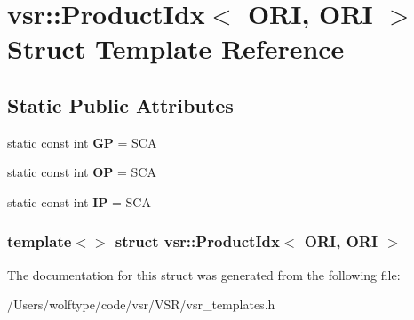 \hypertarget{structvsr_1_1_product_idx_3_01_o_r_i_00_01_o_r_i_01_4}{\section{vsr\-:\-:Product\-Idx$<$ O\-R\-I, O\-R\-I $>$ Struct Template Reference}
\label{structvsr_1_1_product_idx_3_01_o_r_i_00_01_o_r_i_01_4}
}
\subsection*{Static Public Attributes}
\begin{DoxyCompactItemize}
\item 
\hypertarget{structvsr_1_1_product_idx_3_01_o_r_i_00_01_o_r_i_01_4_a7eff6d7ee433fbcf73248b8c5c53253b}{static const int {\bfseries G\-P} = S\-C\-A}\label{structvsr_1_1_product_idx_3_01_o_r_i_00_01_o_r_i_01_4_a7eff6d7ee433fbcf73248b8c5c53253b}

\item 
\hypertarget{structvsr_1_1_product_idx_3_01_o_r_i_00_01_o_r_i_01_4_a965c09c2b2f8285fa2fdda884e940f18}{static const int {\bfseries O\-P} = S\-C\-A}\label{structvsr_1_1_product_idx_3_01_o_r_i_00_01_o_r_i_01_4_a965c09c2b2f8285fa2fdda884e940f18}

\item 
\hypertarget{structvsr_1_1_product_idx_3_01_o_r_i_00_01_o_r_i_01_4_ae16859298b25397f9f02b8489460991d}{static const int {\bfseries I\-P} = S\-C\-A}\label{structvsr_1_1_product_idx_3_01_o_r_i_00_01_o_r_i_01_4_ae16859298b25397f9f02b8489460991d}

\end{DoxyCompactItemize}
\subsubsection*{template$<$$>$ struct vsr\-::\-Product\-Idx$<$ O\-R\-I, O\-R\-I $>$}



The documentation for this struct was generated from the following file\-:\begin{DoxyCompactItemize}
\item 
/\-Users/wolftype/code/vsr/\-V\-S\-R/vsr\-\_\-templates.\-h\end{DoxyCompactItemize}
